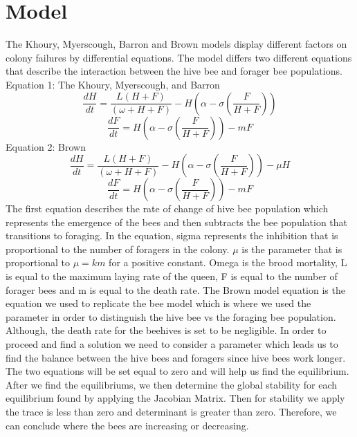 \documentclass[a4paper,10pt]{article}
\begin{document}
\section{Model}
The Khoury, Myerscough, Barron and Brown models display different factors on colony failures by differential equations. The model differs two different equations that describe the interaction between the hive bee and forager bee populations. \\
Equation 1: The Khoury, Myerscough, and Barron
\begin{displaymath}
	\frac{dH}{dt} = \frac{L(H+F)}{(\omega +H+F)} - H(\alpha - \sigma (\frac{F}{H+F}))
\end{displaymath}
\begin{displaymath}
	\frac{dF}{dt} = H(\alpha - \sigma (\frac{F}{H+F})) - mF
\end{displaymath}
Equation 2: Brown
\begin{displaymath}
	\frac{dH}{dt} = \frac{L(H+F)}{(\omega +H+F)} - H(\alpha - \sigma (\frac{F}{H+F})) - \mu H
\end{displaymath}
\begin{displaymath}
	\frac{dF}{dt} = H(\alpha - \sigma (\frac{F}{H+F})) - mF
\end{displaymath}
The first equation describes the rate of change of hive bee population which represents the emergence of the bees and then subtracts the bee population that transitions to foraging. In the equation, sigma represents the inhibition that is proportional to the number of foragers in the colony. $\mu$ is the parameter that is proportional to $\mu = km$ for a positive constant. Omega is the brood mortality, L is equal to the maximum laying rate of the queen, F is equal to the number of forager bees and m is equal to the death rate.
The Brown model equation is the equation we used to replicate the bee model which is where we used the parameter in order to distinguish the hive bee vs the foraging bee population.  
Although, the death rate for the beehives is set to be negligible. In order to proceed and find a solution we need to consider a parameter which leads us to find the balance between the hive bees and foragers since hive bees work longer. The two equations will be set equal to zero and will help us find the equilibrium. After we find the equilibriums, we then determine the global stability for each equilibrium found by applying the Jacobian Matrix. Then for stability we apply the trace is less than zero and determinant is greater than zero. Therefore, we can conclude where the bees are increasing or decreasing.
\end{document}

